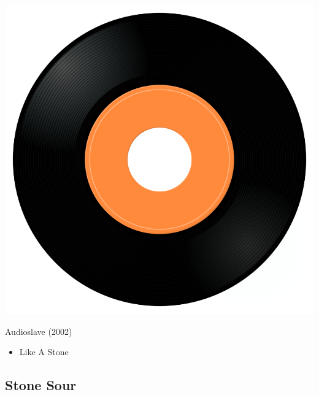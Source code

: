\begin{minipage}[t]{0.25\textwidth}
\captionsetup{type=figure}
\includegraphics[width=\textwidth]{Images/cover.png}
\caption*{Audioslave (2002)}
\end{minipage}
\begin{minipage}[t]{0.25\textwidth}\vspace{0pt}
\begin{itemize}[nosep,leftmargin=1em,labelwidth=*,align=left]
	\setlength{\itemsep}{0pt}
	\item Like A Stone
\end{itemize}
\end{minipage}

\subsection{Stone Sour}


